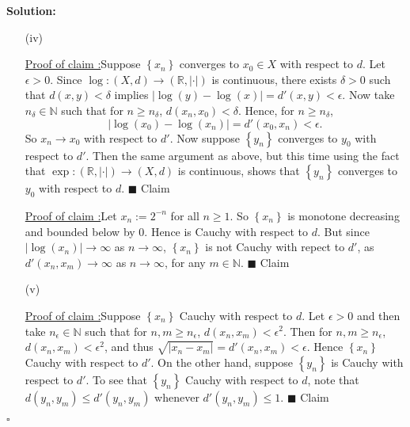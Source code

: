 \documentclass[12pt]{article}
\newcounter{ProofCounter}
\newcounter{ClaimCounter}[ProofCounter]
\newenvironment{Solution}{\stepcounter{ProofCounter}\textbf{Solution:}}{\hfill$\square$}
\newenvironment{claim}[1]{\vspace{1mm}\stepcounter{ClaimCounter}\par\noindent\underline{\bf Claim \theClaimCounter:}\space#1}{}
\newenvironment{claimproof}[1]{\par\noindent\underline{Proof of claim \theClaimCounter:}\space#1}{\hfill $\blacksquare$ Claim \theClaimCounter}
\begin{document}
\begin{Solution}
\begin{enumerate}
    \item[(iv)] 
      \begin{claimproof}
        Suppose $\left\{ x_n \right\}$ converges to $x_0 \in X$ with respect to $d$. Let $\epsilon > 0$. Since $\log : (X,d) \rightarrow (\mathbb{R},
        |\cdot|)$ is continuous, there
        exists $\delta > 0$ such that $d(x,y) < \delta$ implies $|\log(y) - \log(x)| = d'(x,y) < \epsilon$.
        Now take $n_{\delta} \in \mathbb{N}$ such that for $n \geq n_{\delta}$, $d(x_n,x_0) < \delta$. Hence, for $n \geq n_{\delta}$,
        \[
          \big| \log(x_0) - \log(x_n)\big| = d'(x_0, x_n) < \epsilon.
        \]
        So $x_n \rightarrow x_0$ with respect to $d'$. Now suppose $\left\{ y_n \right\}$ converges to $y_0$ with respect to $d'$. Then the
        same argument as above, but this time using the fact that $\exp : (\mathbb{R}, |\cdot|) \rightarrow (X,d)$ is continuous, shows that $\left\{
        y_n \right\}$ converges to $y_0$ with respect to $d$.
      \end{claimproof}

      \begin{claimproof}
        Let $x_n := 2^{-n}$ for all $n\geq 1$. So $\left\{ x_n \right\}$ is monotone decreasing and bounded below by $0$. Hence is Cauchy with respect
        to $d$. But since $|\log(x_n)| \rightarrow \infty$ as $n \rightarrow \infty$,
        $\left\{ x_n \right\}$ is not Cauchy with repect to $d'$, as $d'(x_n, x_m) \rightarrow \infty$ as $n \rightarrow \infty$, for any $m \in
        \mathbb{N}$.
      \end{claimproof}

    \item[(v)]
      \begin{claimproof}
        Suppose $\left\{ x_n \right\}$ Cauchy with respect to $d$. Let $\epsilon > 0$ and then take $n_{\epsilon} \in \mathbb{N}$ such that for $n,m
        \geq n_{\epsilon}$, $d(x_n, x_m) < \epsilon^{2}$. Then for $n,m \geq n_{\epsilon}$,
        $d(x_n, x_m) < \epsilon^{2}$, and thus $\sqrt{|x_n - x_m|} = d'(x_n,x_m) < \epsilon$. Hence $\left\{ x_n \right\}$ Cauchy with respect to
        $d'$. On the other hand, suppose $\left\{ y_n \right\}$ is Cauchy with respect to $d'$. To see that $\left\{ y_n \right\}$ Cauchy with respect
        to $d$, note that $d(y_n, y_m) \leq d'(y_n, y_m)$ whenever $d'(y_n, y_m) \leq 1$.
      \end{claimproof}


\end{enumerate}
\end{Solution}
\end{document}
